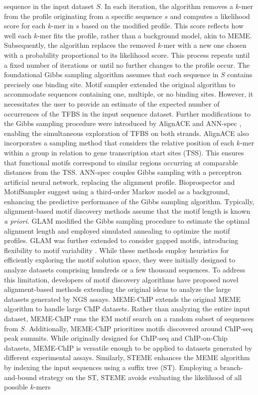 \documentclass[a4paper, titlepage, openright]{book}
\begin{document}
sequence in the input dataset $S$. In each iteration, the algorithm removes a $k$-mer from the profile originating from a specific sequence $s$ and computes a likelihood score for each $k$-mer in $s$ based on the modified profile. This score reflects how well each $k$-mer fits the profile, rather than a background model, akin to MEME. Subsequently, the algorithm replaces the removed $k$-mer with a new one chosen with a probability proportional to its likelihood score. This process repeats until a fixed number of iterations or until no further changes to the profile occur. The foundational Gibbs sampling algorithm \citep{lawrence1990expectation} assumes that each sequence in $S$ contains precisely one binding site. Motif sampler \citep{neuwald1995gibbs} extended the original algorithm to accommodate sequences containing one, multiple, or no binding sites. However, it necessitates the user to provide an estimate of the expected number of occurrences of the TFBS in the input sequence dataset. Further modifications to the Gibbs sampling procedure were introduced by AlignACE \citep{hughes2000computational} and ANN-spec \citep{workman1999ann}, enabling the simultaneous exploration of TFBS on both strands. AlignACE also incorporates a sampling method that considers the relative position of each $k$-mer within a group in relation to gene transcription start sites (TSS). This ensures that functional motifs correspond to similar regions occurring at comparable distances from the TSS. ANN-spec couples Gibbs sampling with a perceptron artificial neural network, replacing the alignment profile. Bioprospector \citep{liu2000bioprospector} and MotifSampler \citep{thijs2001higher} suggest using a third-order Markov model as a background, enhancing the predictive performance of the Gibbs sampling algorithm. Typically, alignment-based motif discovery methods assume that the motif length is known \emph{a priori}. GLAM \citep{frith2004finding} modified the Gibbs sampling procedure to estimate the optimal alignment length and employed simulated annealing to optimize the motif profiles. GLAM was further extended to consider gapped motifs, introducing flexibility to motif variability \citep{frith2008discovering}. While these methods employ heuristics for efficiently exploring the motif solution space, they were initially designed to analyze datasets comprising hundreds or a few thousand sequences. To address this limitation, developers of motif discovery algorithms have proposed novel alignment-based methods extending the original ideas to analyze the large datasets generated by NGS assays. MEME-ChIP \citep{machanick2011meme} extends the original MEME algorithm to handle large ChIP datasets. Rather than analyzing the entire input dataset, MEME-ChIP runs the EM motif search on a random subset of sequences from $S$. Additionally, MEME-ChIP prioritizes motifs discovered around ChIP-seq peak summits. While originally designed for ChIP-seq and ChIP-on-Chip datasets, MEME-ChIP is versatile enough to be applied to datasets generated by different experimental assays. Similarly, STEME \citep{reid2011steme} enhances the MEME algorithm by indexing the input sequences using a suffix tree (ST). Employing a branch-and-bound strategy on the ST, STEME avoids evaluating the likelihood of all possible $k$-mers 
\end{document}
